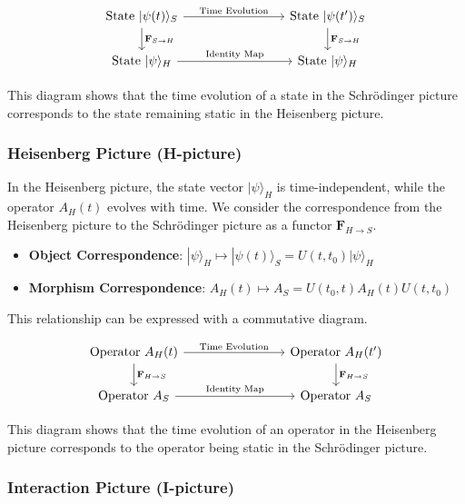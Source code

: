 \documentclass[uplatex,a4j,12pt,dvipdfmx]{jsarticle}
\begin{document}
$$
	\begin{tikzcd}[column sep=8em]
		\text{State } |\psi(t)\rangle_S \arrow[r, "\text{Time Evolution}"] \arrow[d, "\mathbf{F}_{S \to H}"] & \text{State } |\psi(t')\rangle_S \arrow[d, "\mathbf{F}_{S \to H}"] \\
		\text{State } |\psi\rangle_H \arrow[r, "\text{Identity Map}"] & \text{State } |\psi\rangle_H
	\end{tikzcd}
$$

This diagram shows that the time evolution of a state in the Schrödinger picture corresponds to the state remaining static in the Heisenberg picture.



\subsubsection{Heisenberg Picture (H-picture)}

In the Heisenberg picture, the state vector $|\psi\rangle_H$ is time-independent, while the operator $A_H(t)$ evolves with time. We consider the correspondence from the Heisenberg picture to the Schrödinger picture as a functor $\mathbf{F}_{H \to S}$.

\begin{itemize}
	\item \textbf{Object Correspondence}:
	      $|\psi\rangle_H \mapsto |\psi(t)\rangle_S = U(t, t_0)|\psi\rangle_H$
	\item \textbf{Morphism Correspondence}:
	      $A_H(t) \mapsto A_S = U(t_0, t)A_H(t)U(t, t_0)$
\end{itemize}

This relationship can be expressed with a commutative diagram.

$$
	\begin{tikzcd}[column sep=8em]
		\text{Operator } A_H(t) \arrow[r, "\text{Time Evolution}"] \arrow[d, "\mathbf{F}_{H \to S}"] & \text{Operator } A_H(t') \arrow[d, "\mathbf{F}_{H \to S}"] \\
		\text{Operator } A_S \arrow[r, "\text{Identity Map}"] & \text{Operator } A_S
	\end{tikzcd}
$$

This diagram shows that the time evolution of an operator in the Heisenberg picture corresponds to the operator being static in the Schrödinger picture.



\subsubsection{Interaction Picture (I-picture)}
\end{document}
